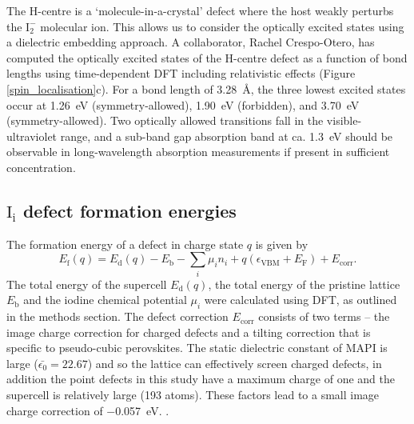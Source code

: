 The H-centre is a `molecule-in-a-crystal' defect where the host weakly perturbs the $\mathrm{I}_2^-$ molecular ion.
This allows us to consider the optically excited states using a dielectric embedding approach.
A collaborator, Rachel Crespo-Otero, has computed the optically excited states of the H-centre defect as a function of bond lengths using time-dependent DFT including relativistic effects (Figure \ref{spin_localisation}c).\autocite{Whalley2017b} 
For a bond length of \SI{3.28}{\angstrom}, the three lowest excited states occur at \SI{1.26}{\electronvolt} (symmetry-allowed), \SI{1.90}{\electronvolt} (forbidden), and \SI{3.70}{\electronvolt} (symmetry-allowed). Two optically allowed transitions fall in the visible-ultraviolet range, and a sub-band gap absorption band at ca. \SI{1.3}{\electronvolt} should be observable in long-wavelength absorption measurements if present in sufficient concentration.

\subsection{$\textrm{I}_\textrm{i}$ defect formation energies} \label{ss:dfe}

The formation energy of a defect in charge state $q$ is given by
\begin{equation} \label{eqn_formation_energy}
E_\mathrm{f}(q) = E_\mathrm{d}(q) - E_\mathrm{b} - \sum_i \mu_i n_i + q(\epsilon_\mathrm{VBM}+E_\mathrm{F}) + E_\mathrm{corr}.
\end{equation}
The total energy of the supercell $E_\mathrm{d}(q)$, the total energy of the pristine lattice $E_\mathrm{b}$ and the iodine chemical potential $\mu_i$ were calculated using DFT, as outlined in the methods section.
The defect correction $E_\mathrm{corr}$ consists of two terms -- the image charge correction for charged defects and a tilting correction that is specific to pseudo-cubic perovskites.
The static dielectric constant of MAPI is large ($\bar{\epsilon_0}=22.67$)\autocite{Brivio2013} and so the lattice can effectively screen charged defects, in addition the point defects in this study have a maximum charge of one and the supercell is relatively large (193 atoms). These factors lead to a small image charge correction of \SI{-0.057}{eV}. .

